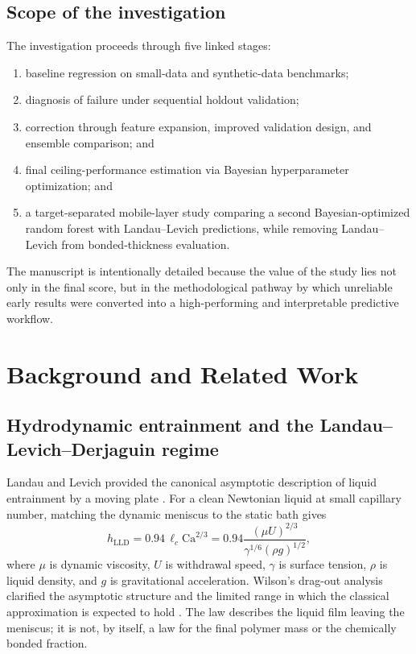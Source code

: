 \documentclass[11pt]{article}
\begin{document}
\subsection{Scope of the investigation}
The investigation proceeds through five linked stages:
\begin{enumerate}
    \item baseline regression on small-data and synthetic-data benchmarks;
    \item diagnosis of failure under sequential holdout validation;
    \item correction through feature expansion, improved validation design, and ensemble comparison; and
    \item final ceiling-performance estimation via Bayesian hyperparameter optimization; and
    \item a target-separated mobile-layer study comparing a second Bayesian-optimized random forest with Landau--Levich predictions, while removing Landau--Levich from bonded-thickness evaluation.
\end{enumerate}

The manuscript is intentionally detailed because the value of the study lies not only in the final score, but in the methodological pathway by which unreliable early results were converted into a high-performing and interpretable predictive workflow.

\section{Background and Related Work}

\subsection{Hydrodynamic entrainment and the Landau--Levich--Derjaguin regime}
Landau and Levich provided the canonical asymptotic description of liquid entrainment by a moving plate \cite{landau1942}. For a clean Newtonian liquid at small capillary number, matching the dynamic meniscus to the static bath gives
\begin{equation}
h_{\mathrm{LLD}} = 0.94\,\ell_c\mathrm{Ca}^{2/3}
=0.94\frac{(\mu U)^{2/3}}{\gamma^{1/6}(\rho g)^{1/2}},
\end{equation}
where $\mu$ is dynamic viscosity, $U$ is withdrawal speed, $\gamma$ is surface tension, $\rho$ is liquid density, and $g$ is gravitational acceleration. Wilson's drag-out analysis clarified the asymptotic structure and the limited range in which the classical approximation is expected to hold \cite{wilson1982}. The law describes the liquid film leaving the meniscus; it is not, by itself, a law for the final polymer mass or the chemically bonded fraction.
\end{document}

